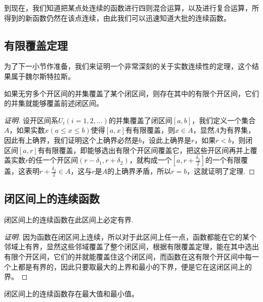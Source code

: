 到现在，我们知道把某点处连续的函数进行四则混合运算，以及进行复合运算，所得到的新函数仍然在该点连续，由此我们可以迅速知道大批的连续函数。

\subsection{有限覆盖定理}
\label{sec:finite-covering-theorem}

为了下一小节作准备，我们来证明一个非常深刻的关于实数连续性的定理，这个结果属于魏尔斯特拉斯。

\begin{theorem}[魏尔斯特拉斯有限覆盖定理]
  如果无穷多个开区间的并集覆盖了某个闭区间，则存在其中的有限个开区间，它们的并集就能够覆盖前述闭区间。
\end{theorem}

\begin{proof}[证明]
  设开区间系$U_i(i=1,2,\ldots)$的并集覆盖了闭区间$[a,b]$，我们定义一个集合$A$，如果实数$x(a \leqslant x \leqslant b)$使得$[a,x]$有有限覆盖，则$x \in A$，显然$A$为有界集，因此有上确界，我们证明这个上确界必然是$b$，设此上确界是$r$，如果$r<b$，则闭区间$[a,r]$有有限覆盖，即能够选出有限个开区间覆盖它，把这些开区间再并上覆盖实数$r$的任一个开区间$(r-\delta_1,r+\delta_2)$，就构成一个$[a,r+\frac{\delta_2}{2}]$的一个有限覆盖，这表明$r+\frac{\delta_2}{2}\in A$，这与$r$是$A$的上确界矛盾，所以$r=b$，这就证明了定理.
\end{proof}

\subsection{闭区间上的连续函数}
\label{sec:continuous-function-in-closed-interval}

\begin{theorem}
  \label{theorem:function-bound-when-continuous-at-closed-interval}
  闭区间上的连续函数在此区间上必定有界.
\end{theorem}

\begin{proof}[证明]
  因为函数在闭区间上连续，所以对于此区间上任一点，函数都能在它的某个邻域上有界，显然这些邻域覆盖了整个闭区间，根据有限覆盖定理，能在其中选出有限个开区间，它们的并就能覆盖住这个闭区间，而函数在这有限个开区间中每一个上都是有界的，因此只要取最大的上界和最小的下界，便是它在这闭区间上的界。
\end{proof}

\begin{theorem}
  闭区间上的连续函数存在最大值和最小值。
\end{theorem}

